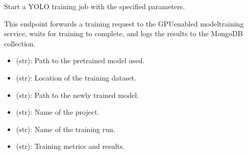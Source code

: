 \documentclass[letterpaper,10pt,english]{sphinxmanual}
\begin{document}
\begin{fulllineitems}
\label{\detokenize{modules/src.pig_sorting_api.main:src.pig_sorting_api.main.run_training}}
\pysigstartsignatures
\pysiglinewithargsret
{}
{\sphinxparamcomma {}\sphinxparamcomma {}\sphinxparamcomma {}}
{}
\pysigstopsignatures
\sphinxAtStartPar
Start a YOLO training job with the specified parameters.

\sphinxAtStartPar
This endpoint forwards a training request to the GPU\sphinxhyphen{}enabled
model\sphinxhyphen{}training service, waits for training to complete, and logs
the results to the MongoDB  collection.
\begin{description}
\begin{itemize}
\item {} 
\sphinxAtStartPar
{} (str): Path to the pretrained model used.

\item {} 
\sphinxAtStartPar
{} (str): Location of the training dataset.

\item {} 
\sphinxAtStartPar
{} (str): Path to the newly trained model.

\item {} 
\sphinxAtStartPar
{} (str): Name of the project.

\item {} 
\sphinxAtStartPar
{} (str): Name of the training run.

\item {} 
\sphinxAtStartPar
{} (str): Training metrics and results.


\end{itemize}
\end{description}
\end{fulllineitems}
\end{document}
